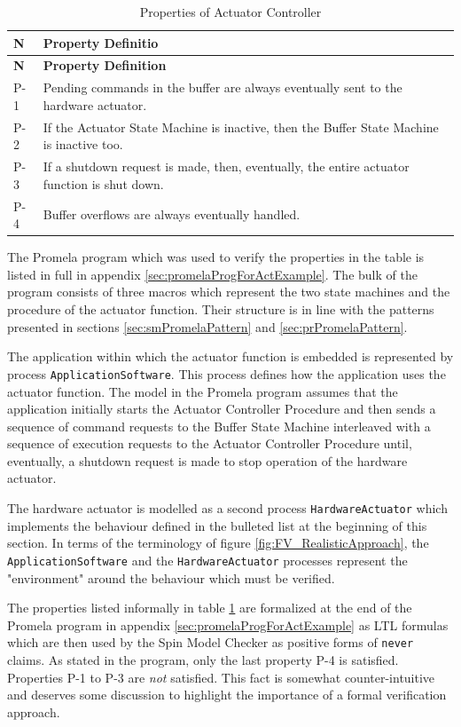 \documentclass[a4paper,10pt]{article}
\begin{document}
\newpage
\begin{longtable}{|p{0.9cm}|p{10.3cm}|}
\caption{Properties of Actuator Controller} \label{tab:actContProp}\\
\hline
\rowcolor{lightblue}
\textbf{N} & \textbf{Property Definitio} \\
\hline\hline
\endfirsthead
\rowcolor{lightblue}
\textbf{N} & \textbf{Property Definition} \\
\hline\hline
\endhead
P-1 & Pending commands in the buffer are always eventually sent to the hardware actuator. \\
\hline
P-2 & If the Actuator State Machine is inactive, then the Buffer State Machine is inactive too. \\
\hline
P-3 & If a shutdown request is made, then, eventually, the entire actuator function is shut down. \\
\hline
P-4 & Buffer overflows are always eventually handled. \\
\hline
\end{longtable}

The Promela program which was used to verify the properties in the table is listed in full in appendix \ref{sec:promelaProgForActExample}. The bulk of the program consists of three macros which represent the two state machines and the procedure of the actuator function. Their structure is in line with the patterns presented in sections \ref{sec:smPromelaPattern} and \ref{sec:prPromelaPattern}. 

The application within which the actuator function is embedded is represented by process \texttt{ApplicationSoftware}. This process defines how the application uses the actuator function. The model in the Promela program assumes that the application initially starts the Actuator Controller Procedure and then sends a sequence of command requests to the Buffer State Machine interleaved with a sequence of execution requests to the Actuator Controller Procedure until, eventually, a shutdown request is made to stop operation of the hardware actuator.

The hardware actuator is modelled as a second process \texttt{HardwareActuator} which implements the behaviour defined in the bulleted list at the beginning of this section. In terms of the terminology of figure \ref{fig:FV_RealisticApproach}, the \texttt{ApplicationSoftware} and the \texttt{HardwareActuator} processes represent the "environment" around the behaviour which must be verified.

The properties listed informally in table \ref{tab:actContProp} are formalized at the end of the Promela program in appendix \ref{sec:promelaProgForActExample} as LTL formulas which are then used by the Spin Model Checker as positive forms of \texttt{never} claims. As stated in the program, only the last property P-4 is satisfied. Properties P-1 to P-3 are \textit{not} satisfied. This fact is somewhat counter-intuitive and deserves some discussion to highlight the importance of a formal verification approach.
\end{document}
